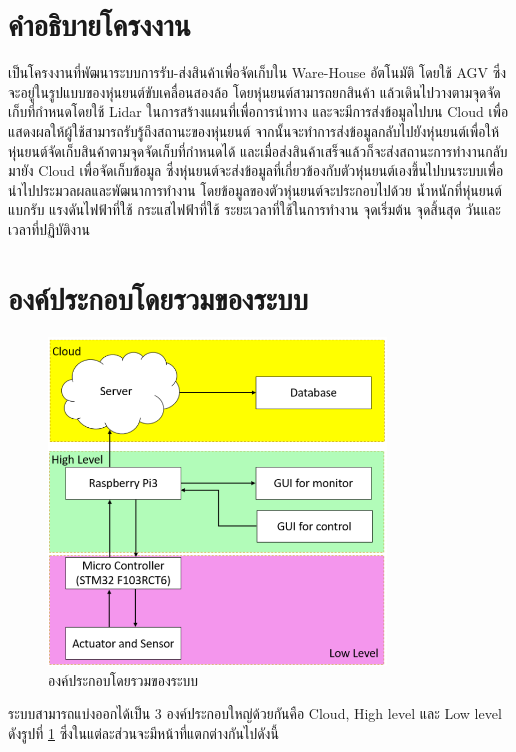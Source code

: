 \documentclass{classes/fiboreport}
\begin{document}
\section{คำอธิบายโครงงาน}
เป็นโครงงานที่พัฒนาระบบการรับ-ส่งสินค้าเพื่อจัดเก็บใน Ware-House อัตโนมัติ โดยใช้ AGV
ซึ่งจะอยู่ในรูปแบบของหุ่นยนต์ขับเคลื่อนสองล้อ โดยหุ่นยนต์สามารถยกสินค้า
แล้วเดินไปวางตามจุดจัดเก็บที่กำหนดโดยใช้ Lidar ในการสร้างแผนที่เพื่อการนำทาง
และจะมีการส่งข้อมูลไปบน Cloud เพื่อแสดงผลให้ผู้ใช้สามารถรับรู้ถึงสถานะของหุ่นยนต์
จากนั้นจะทำการส่งข้อมูลกลับไปยังหุ่นยนต์เพื่อให้หุ่นยนต์จัดเก็บสินค้าตามจุดจัดเก็บที่กำหนดได้
และเมื่อส่งสินค้าเสร็จแล้วก็จะส่งสถานะการทำงานกลับมายัง Cloud เพื่อจัดเก็บข้อมูล
ซึ่งหุ่นยนต์จะส่งข้อมูลที่เกี่ยวข้องกับตัวหุ่นยนต์เองขึ้นไปบนระบบเพื่อนำไปประมวลผลและพัฒนาการทำงาน
โดยข้อมูลของตัวหุ่นยนต์จะประกอบไปด้วย น้ำหนักที่หุ่นยนต์แบกรับ แรงดันไฟฟ้าที่ใช้
กระแสไฟฟ้าที่ใช้ ระยะเวลาที่ใช้ในการทำงาน จุดเริ่มต้น จุดสิ้นสุด วันและเวลาที่ปฏิบัติงาน

\section{องค์ประกอบโดยรวมของระบบ}
\begin{figure}[!ht]
	\centering
	\includegraphics[width=0.8\textwidth]{images/system_overview.png}
	\caption{องค์ประกอบโดยรวมของระบบ}
	\label{fig:system_overview}
\end{figure}
\clearpage
ระบบสามารถแบ่งออกได้เป็น 3 องค์ประกอบใหญ่ด้วยกันคือ Cloud, High level และ Low level ดังรูปที่ \ref{fig:system_overview}
ซึ่งในแต่ละส่วนจะมีหน้าที่แตกต่างกันไปดังนี้
\end{document}
